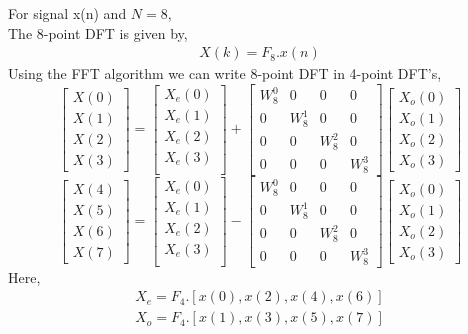 \documentclass{beamer}
\begin{document}
\begin{frame}
For signal x(n) and $N=8$,\\
The 8-point DFT is given by,
\begin{align}
  X(k) = F_{8}.x(n)
\end{align}
Using the FFT algorithm we can write 8-point DFT in 4-point DFT's,
\begin{equation}
\begin{bmatrix}
X(0) \\ 
X(1) \\ 
X(2) \\ 
X(3)
\end{bmatrix}
=
\begin{bmatrix}
X_{e}(0) \\ 
X_{e}(1)\\ 
X_{e}(2)\\
X_{e}(3)\\
\end{bmatrix}
+
\begin{bmatrix}
W^{0}_{8} & 0 & 0 & 0\\
0 & W^{1}_{8} & 0 & 0\\
0 & 0 & W^{2}_{8} & 0\\
0 & 0 & 0 & W^{3}_{8}
\end{bmatrix}
\begin{bmatrix}
X_{o}(0) \\ 
X_{o}(1) \\ 
X_{o}(2) \\
X_{o}(3)
\end{bmatrix}
\end{equation}
\begin{equation}
\begin{bmatrix}
X(4) \\ 
X(5) \\ 
X(6) \\ 
X(7)
\end{bmatrix}
=
\begin{bmatrix}
X_{e}(0) \\ 
X_{e}(1)\\ 
X_{e}(2)\\
X_{e}(3)\\
\end{bmatrix}
-
\begin{bmatrix}
W^{0}_{8} & 0 & 0 & 0\\
0 & W^{1}_{8} & 0 & 0\\
0 & 0 & W^{2}_{8} & 0\\
0 & 0 & 0 & W^{3}_{8}
\end{bmatrix}
\begin{bmatrix}
X_{o}(0) \\ 
X_{o}(1) \\ 
X_{o}(2) \\
X_{o}(3)
\end{bmatrix}
\end{equation}
Here, 
\begin{align}
    X_{e} = F_{4}.[x(0),x(2),x(4),x(6)] \\
    X_{o} = F_{4}.[x(1),x(3),x(5),x(7)]
\end{align}
\end{frame}
\end{document}
